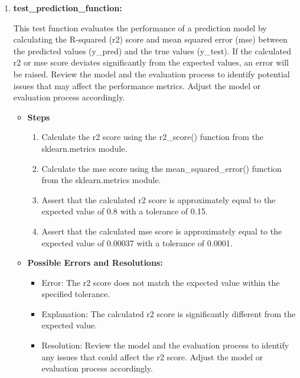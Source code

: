 \begin{enumerate}
		
			\item \textbf{test\_prediction\_function:}
			
			This test function evaluates the performance of a prediction model by calculating the R-squared (r2) score and mean squared error (mse) between the predicted values (y\_pred) and the true values (y\_test). If the calculated r2 or mse score deviates significantly from the expected values, an error will be raised. Review the model and the evaluation process to identify potential issues that may affect the performance metrics. Adjust the model or evaluation process accordingly.
			
				\begin{itemize}
				
				\item \textbf{Steps}
				
					\begin{enumerate}
						
						\item Calculate the r2 score using the r2\_score() function from the sklearn.metrics module.
						
						\item Calculate the mse score using the mean\_squared\_error() function from the sklearn.metrics module.
						
						\item Assert that the calculated r2 score is approximately equal to the expected value of 0.8 with a tolerance of 0.15. 
						
						\item Assert that the calculated mse score is approximately equal to the expected value of 0.00037 with a tolerance of 0.0001.
					\end{enumerate}
					
				
				\item \textbf{Possible Errors and Resolutions:}
				
				\begin{itemize}
					
					\item Error: The r2 score does not match the expected value within the specified tolerance.
					
					\item Explanation: The calculated r2 score is significantly different from the expected value.
					
					\item Resolution: Review the model and the evaluation process to identify any issues that could affect the r2 score. Adjust the model or evaluation process accordingly.
					

\end{itemize}
\end{itemize}
\end{enumerate}

